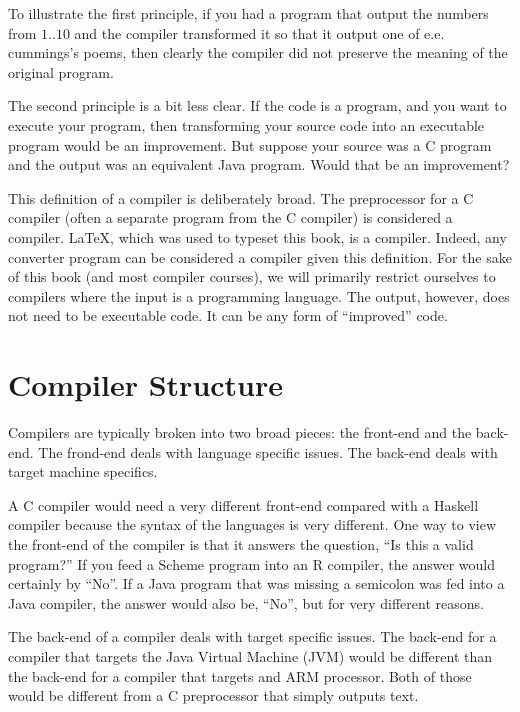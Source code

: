\documentclass[letterpaper,12pt,openany,reqno]{book}%
\begin{document}
To illustrate the first principle, if you had a program that output the numbers from $1..10$ and the compiler transformed it so that it output one of e.e. cummings's poems, then clearly the compiler did not preserve the meaning of the original program.

The second principle is a bit less clear. If the code is a program, and you want to execute your program, then transforming your source code into an executable program would be an improvement. But suppose your source was a C program and the output was an equivalent Java program. Would that be an improvement?

This definition of a compiler is deliberately broad. The preprocessor for a C compiler (often a separate program from the C compiler) is considered a compiler. \LaTeX, which was used to typeset this book, is a compiler. Indeed, any converter program can be considered a compiler given this definition. For the sake of this book (and most compiler courses), we will primarily restrict ourselves to compilers where the input is a programming language. The output, however, does not need to be executable code. It can be any form of ``improved'' code.

\chapter{Compiler Structure}
Compilers are typically broken into two broad pieces: the front-end and the back-end. The frond-end deals with language specific issues. The back-end deals with target machine specifics.

A C compiler would need a very different front-end compared with a Haskell compiler because the syntax of the languages is very different. One way to view the front-end of the compiler is that it answers the question, ``Is this a valid program?'' If you feed a Scheme program into an R compiler, the answer would certainly by ``No''. If a Java program that was missing a semicolon was fed into a Java compiler, the answer would also be, ``No'', but for very different reasons.

The back-end of a compiler deals with target specific issues. The back-end for a compiler that targets the Java Virtual Machine (JVM) would be different than the back-end for a compiler that targets and ARM processor. Both of those would be different from a C preprocessor that simply outputs text.
\end{document}
